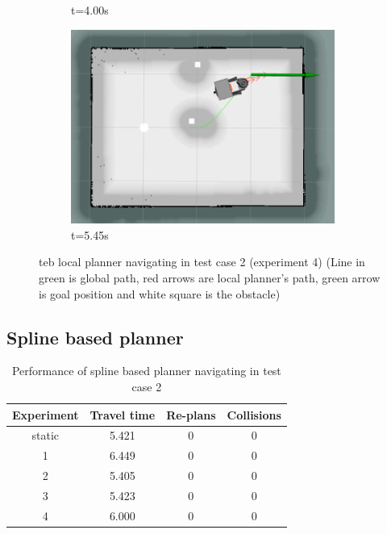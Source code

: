 \begin{figure}[H]
\begin{subfigure}[b]{0.35\linewidth}
        \caption{t=4.00s}
    \end{subfigure}%
    \begin{subfigure}[b]{0.35\linewidth}
        \centering
        \includegraphics[width=0.95\textwidth]{images/teb_single_2_obs/4/3045.png}
        \caption{t=5.45s}
    \end{subfigure}%
    \caption{teb local planner navigating in test case 2 (experiment 4) (Line in green is
        global path, red arrows are local planner's path, green arrow is goal position and 
        white square is the obstacle)}\label{fig:teb_test_case_2_exp_4}
\end{figure}

\subsection{Spline based planner}%
\label{sub:eval_spline_based_planner_tc2}

\begin{table}[H]
    \centering
    \begin{tabular}{cccc}
        \textbf{Experiment} & \textbf{Travel time} & \textbf{Re-plans} & \textbf{Collisions} \\\toprule
        static & 5.421 & 0 & 0 \\
             1 & 6.449 & 0 & 0 \\
             2 & 5.405 & 0 & 0 \\
             3 & 5.423 & 0 & 0 \\
             4 & 6.000 & 0 & 0 \\
    \end{tabular}
    \caption{Performance of spline based planner navigating in test case 2}\label{tab:perfomance_spline_test_case_2}
\end{table}

